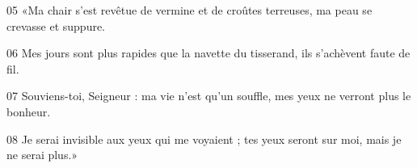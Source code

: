 
05 «Ma chair s’est revêtue de vermine et de croûtes terreuses, ma peau se crevasse et suppure.

06 Mes jours sont plus rapides que la navette du tisserand, ils s’achèvent faute de fil.

07 Souviens-toi, Seigneur : ma vie n’est qu’un souffle, mes yeux ne verront plus le bonheur.

08 Je serai invisible aux yeux qui me voyaient ; tes yeux seront sur moi, mais je ne serai plus.»
